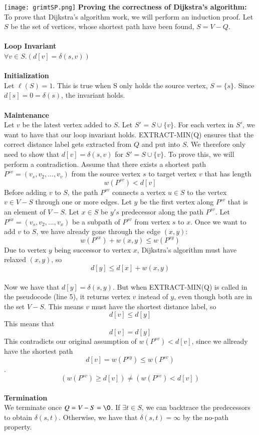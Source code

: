 \documentclass[11pt]{article}
\begin{document}
\texttt{[image: grimtSP.png]}
\newpage
\noindent\textbf{Proving the correctness of Dijkstra's algorithm:}\\
To prove that Dijkstra's algorithm work, we will perform an induction proof. Let $S$ be the set of vertices, whose shortest path have been found, $S=V-Q$.\\\\
\textbf{Loop Invariant}\\
$\forall v\in S.(d[v] = \delta(s,v))$\\\\
\textbf{Initialization}\\
Let $\ell(S)=1$. This is true when S only holds the source vertex, $S = \{s\}$. Since $d[s]=0=\delta(s)$, the invariant holds.\\\\
\textbf{Maintenance}\\
Let $v$ be the latest vertex added to $S$. Let $S'$ = $S \cup \{v\}$. For each vertex in $S'$, we want to have that our loop invariant holds. EXTRACT-MIN(Q) ensures that the correct distance label gets extracted from $Q$ and put into $S$. We therefore only need to show that $d[v]=\delta(s,v)$ for $S'=S \cup \{v\}$. To prove this, we will perform a contradiction. Assume that there exists a shortest path $P^{sv}=(v_s, v_2, ..., v_v)$ from the source vertex $s$ to target vertex $v$ that has length $$w(P^{sv}) < d[v]$$
Before adding $v$ to $S$, the path $P^{sv}$ connects a vertex $u\in S$ to the vertex $v\in V-S$ through one or more edges. Let $y$ be the first vertex along $P^{sv}$ that is an element of $V-S$. Let $x\in S$ be $y's$ predecessor along the path $P^{sv}$. Let $P^{sx}=(v_s, v_2, ..., v_x)$ be a subpath of $P^{sv}$ from vertex $s$ to $x$. Once we want to add $v$ to $S$, we have already gone through the edge $(x,y)$: $$w(P^{sx}) + w(x,y) \leq w(P^{sy})$$
Due to vertex $y$ being successor to vertex $x$, Dijkstra's algorithm must have relaxed $(x,y)$, so $$d[y]\leq d[x]+w(x,y)$$\\
Now we have that $d[y] = \delta(s,y)$. But when EXTRACT-MIN(Q) is called in the pseudocode (line 5), it returns vertex $v$ instead of $y$, even though both are in the set $V-S$. This means $v$ must have the shortest distance label, so $$d[v] \leq d[y]$$
This means that $$d[v] = d[y]$$ This contradicts our original assumption of $w(P^{sv}) < d[v]$, since we allready have the shortest path $$d[v] = w(P^{sy}) \leq w(P^{sv})$$.
$$(w(P^{sv}) \geq d[v]) \neq (w(P^{sv}) < d[v])$$\\
\textbf{Termination}\\
We terminate once $Q = V-S =\O$. If $\exists t \in S$, we can backtrace the predecessors to obtain $\delta(s,t)$. Otherwise, we have that $\delta(s,t) = \infty$ by the no-path property.\\
\end{document}
